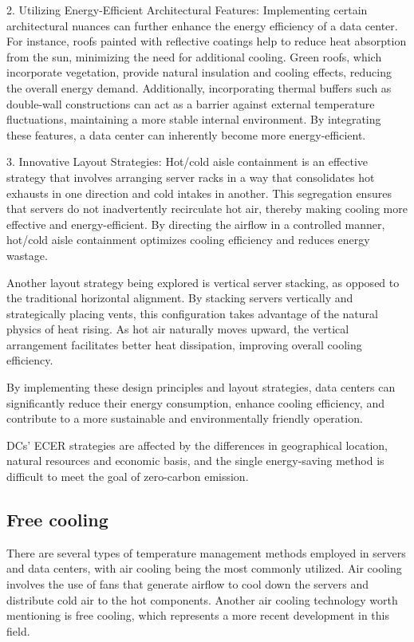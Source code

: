 \documentclass[
  a4paper,  %
  twoside,  %
  bibliography=totoc,
  headsepline,
  cleardoublepage=empty,
  parskip=half,
  draft=false
]{scrbook}
\begin{document}
2. Utilizing Energy-Efficient Architectural Features:
Implementing certain architectural nuances can further enhance the energy efficiency of a data center. For instance, roofs painted with reflective coatings help to reduce heat absorption from the sun, minimizing the need for additional cooling. Green roofs, which incorporate vegetation, provide natural insulation and cooling effects, reducing the overall energy demand. Additionally, incorporating thermal buffers such as double-wall constructions can act as a barrier against external temperature fluctuations, maintaining a more stable internal environment. By integrating these features, a data center can inherently become more energy-efficient.

3. Innovative Layout Strategies:
Hot/cold aisle containment is an effective strategy that involves arranging server racks in a way that consolidates hot exhausts in one direction and cold intakes in another. This segregation ensures that servers do not inadvertently recirculate hot air, thereby making cooling more effective and energy-efficient. By directing the airflow in a controlled manner, hot/cold aisle containment optimizes cooling efficiency and reduces energy wastage.

Another layout strategy being explored is vertical server stacking, as opposed to the traditional horizontal alignment. By stacking servers vertically and strategically placing vents, this configuration takes advantage of the natural physics of heat rising. As hot air naturally moves upward, the vertical arrangement facilitates better heat dissipation, improving overall cooling efficiency.

By implementing these design principles and layout strategies, data centers can significantly reduce their energy consumption, enhance cooling efficiency, and contribute to a more sustainable and environmentally friendly operation.

DCs’ ECER strategies are affected by the differences in geographical location, natural resources and economic basis, and the single energy-saving method is difficult to meet the goal of zero-carbon emission.


\subsection{Free cooling}
There are several types of temperature management methods employed in servers and data centers, with air cooling being the most commonly utilized. Air cooling involves the use of fans that generate airflow to cool down the servers and distribute cold air to the hot components. Another air cooling technology worth mentioning is free cooling, which represents a more recent development in this field.
\end{document}
